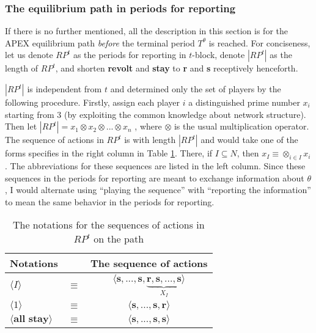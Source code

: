 \documentclass[12pt,letter]{article}
\theoremstyle{definition}
\theoremstyle{remark}
\theoremstyle{claim}
\begin{document}
\subsubsection{The equilibrium path in periods for reporting}
\label{sec:eq_rp}
If there is no further mentioned, all the description in this section is for the APEX equilibrium path \textit{before} the terminal period $T^{\theta}$ is reached. For conciseness, let us denote $RP^{t}$ as the periods for reporting in $t$-block, denote $|RP^t|$ as the length of $RP^{t}$, and shorten \textbf{revolt} and \textbf{stay} to \textbf{r} and \textbf{s} receptively henceforth. 

$|RP^{t}|$ is independent from $t$ and determined only the set of players by the following procedure. Firstly, assign each player $i$ a distinguished prime number $x_i$ starting from $3$ (by exploiting the common knowledge about network structure). Then let $|RP^{t}|=x_1\otimes x_2\otimes...\otimes x_n$ , where $\otimes$ is the usual multiplication operator. The sequence of actions in $RP^{t}$ is with length $|RP^t|$ and would take one of the forms specifies in the right column in Table \ref{Table_msg_form}. There, if $I\subseteq N$, then $x_{I}\equiv \otimes_{i\in I}x_i$. The abbreviations for these sequences are listed in the left column. Since these sequences in the periods for reporting are meant to exchange information about $\theta$, I would alternate using ``playing the sequence'' with ``reporting the information'' to mean the same behavior in the periods for reporting.


\begin{table}[!htbp]
\caption{The notations for the sequences of actions in $RP^t$ on the path}
\label{Table_msg_form}
\begin{center}
\begin{tabular}{l c c}
Notations && The sequence of actions\\
\hline
\hline
$\langle  I \rangle$ 				& $\equiv$ 			& $\langle \textbf{s},...,\textbf{s},\underbrace{\textbf{r},\textbf{s},...,\textbf{s}}_{X_{I}} \rangle$  \\
$\langle 1 \rangle$	 					& $\equiv$ 			& $\langle \textbf{s},...,\textbf{s},{\textbf{r}}\rangle$  \\
$\langle \textbf{all stay} \rangle$	 					& $\equiv$ 			& $\langle \textbf{s},...,\textbf{s},{\textbf{s}}\rangle$  \\
\hline
\end{tabular}
\end{center}
\end{table}
\end{document}
